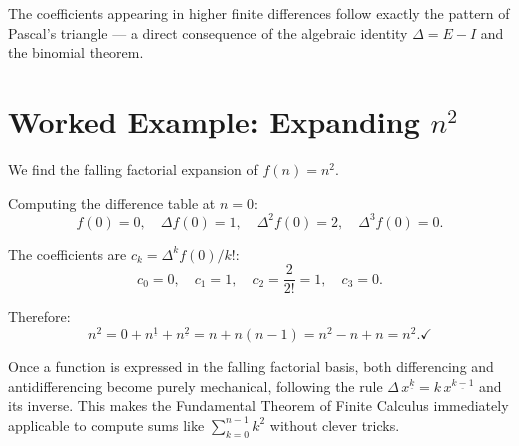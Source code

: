 \begin{remark*}
The coefficients appearing in higher finite differences follow exactly
the pattern of Pascal's triangle --- a direct consequence of the
algebraic identity \(\Delta = E - I\) and the binomial theorem.
\end{remark*}

\section*{\texorpdfstring{Worked Example: Expanding \(n^2\)}{Worked Example: Expanding n squared}}

We find the falling factorial expansion of \(f(n) = n^2\).

Computing the difference table at \(n = 0\):
\[
f(0) = 0, \quad
\Delta f(0) = 1, \quad
\Delta^2 f(0) = 2, \quad
\Delta^3 f(0) = 0.
\]

The coefficients are \(c_k = \Delta^k f(0)/k!\):
\[
c_0 = 0, \quad c_1 = 1, \quad c_2 = \frac{2}{2!} = 1, \quad c_3 = 0.
\]

Therefore:
\[
n^2 = 0 + n^{\underline{1}} + n^{\underline{2}}
= n + n(n-1)
= n^2 - n + n
= n^2. \checkmark
\]

\begin{remark*}
Once a function is expressed in the falling factorial basis, both
differencing and antidifferencing become purely mechanical, following the
rule \(\Delta\,x^{\underline{k}} = k\,x^{\underline{k-1}}\) and its
inverse. This makes the Fundamental Theorem of Finite Calculus
immediately applicable to compute sums like \(\sum_{k=0}^{n-1} k^2\)
without clever tricks.
\end{remark*}
